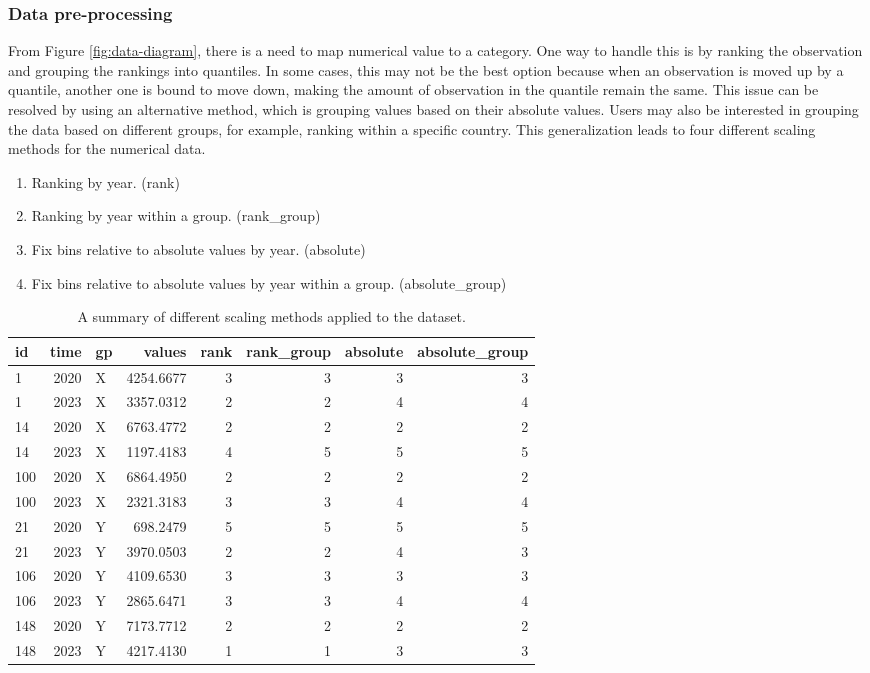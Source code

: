 \subsubsection{Data pre-processing}\label{data-pre-processing}

From Figure \ref{fig:data-diagram}, there is a need to map numerical value to a category. One way to handle this is by ranking the observation and grouping the rankings into quantiles. In some cases, this may not be the best option because when an observation is moved up by a quantile, another one is bound to move down, making the amount of observation in the quantile remain the same. This issue can be resolved by using an alternative method, which is grouping values based on their absolute values. Users may also be interested in grouping the data based on different groups, for example, ranking within a specific country. This generalization leads to four different scaling methods for the numerical data.

\begin{enumerate}
\def\labelenumi{\arabic{enumi}.}
\tightlist
\item
  Ranking by year. (rank)
\item
  Ranking by year within a group. (rank\_group)
\item
  Fix bins relative to absolute values by year. (absolute)
\item
  Fix bins relative to absolute values by year within a group. (absolute\_group)
\end{enumerate}

\begin{table}

\caption{\label{tab:tbl-scaling}A summary of different scaling methods applied to the dataset.}
\centering
\begin{tabular}[t]{l|r|l|r|r|r|r|r}
\hline
id & time & gp & values & rank & rank\_group & absolute & absolute\_group\\
\hline
1 & 2020 & X & 4254.6677 & 3 & 3 & 3 & 3\\
\hline
1 & 2023 & X & 3357.0312 & 2 & 2 & 4 & 4\\
\hline
14 & 2020 & X & 6763.4772 & 2 & 2 & 2 & 2\\
\hline
14 & 2023 & X & 1197.4183 & 4 & 5 & 5 & 5\\
\hline
100 & 2020 & X & 6864.4950 & 2 & 2 & 2 & 2\\
\hline
100 & 2023 & X & 2321.3183 & 3 & 3 & 4 & 4\\
\hline
21 & 2020 & Y & 698.2479 & 5 & 5 & 5 & 5\\
\hline
21 & 2023 & Y & 3970.0503 & 2 & 2 & 4 & 3\\
\hline
106 & 2020 & Y & 4109.6530 & 3 & 3 & 3 & 3\\
\hline
106 & 2023 & Y & 2865.6471 & 3 & 3 & 4 & 4\\
\hline
148 & 2020 & Y & 7173.7712 & 2 & 2 & 2 & 2\\
\hline
148 & 2023 & Y & 4217.4130 & 1 & 1 & 3 & 3\\
\hline
\end{tabular}
\end{table}

